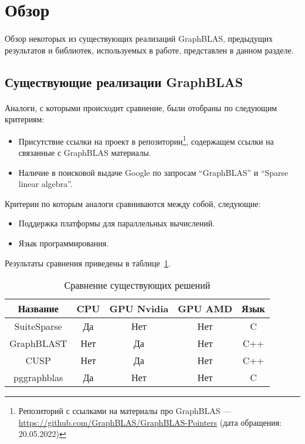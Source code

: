 \documentclass[14pt]{matmex-diploma-custom}
\begin{document}
\section{Обзор}
\paragraph{}Обзор некоторых из существующих реализаций GraphBLAS, предыдущих результатов и библиотек, используемых в работе, представлен в данном разделе.

\subsection{Существующие реализации GraphBLAS}
\paragraph{} Аналоги, с которыми происходит сравнение, были отобраны по следующим критериям:
\begin{itemize}
    \item Присутствие ссылки на проект в репозитории\footnote{Репозиторий с ссылками на материалы про GraphBLAS --- \url{https://github.com/GraphBLAS/GraphBLAS-Pointers} (дата обращения: 20.05.2022)}, содержащем ссылки на связанные с GraphBLAS материалы.
    \item Наличие в поисковой выдаче Google по запросам ``GraphBLAS'' и ``Sparse linear algebra''.
\end{itemize}

Критерии по которым аналоги сравниваются между собой, следующие:
\begin{itemize}
    \item Поддержка платформы для параллельных вычислений.
    \item Язык программирования.
\end{itemize}

Результаты сравнения приведены в таблице~\ref{comparison}.
\begin{table}[h]
\center{}
    \begin{tabular}{ | c || c | c | c | c | }
      \hline
      Название & CPU & GPU Nvidia & GPU AMD & Язык \\
      \hline
      \hline
      SuiteSparse & Да & Нет & Нет & C \\ 
      \hline
      GraphBLAST & Нет & Да & Нет & C++ \\
      \hline
      CUSP & Нет & Да & Нет & C++ \\
      \hline
      pggraphblas & Да & Нет & Нет & C \\
      \hline
    \end{tabular}
\caption{Сравнение существующих решений}
\label{comparison}
\end{table}
\end{document}
